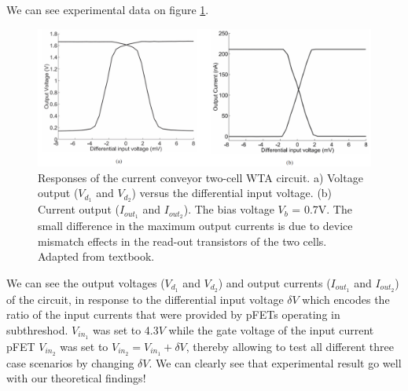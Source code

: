We can see experimental data on figure \ref{fig:WTA_Output}. 

\begin{figure}[H]
    \centering
    \includegraphics[width=0.9\linewidth]{../../Figures/WTA_Output.PNG}
    \caption{Responses of the current conveyor two-cell WTA circuit. a) Voltage output ($V_d_1$ and $V_d_2$) versus the differential input voltage. (b) Current output ($I_{out_1}$ and $I_{out_2}$). The bias voltage $V_b$ = 0.7V. The small difference in the maximum output currents is due to device mismatch effects in the read-out transistors of the two cells. Adapted from textbook.}
    \label{fig:WTA_Output}
\end{figure}

We can see the output voltages ($V_d_1$ and $V_d_2$) and output currents ($I_{out}_1$ and $I_{out}_2$) of the circuit, in response to the differential input voltage $\delta V$ which encodes the ratio of the input currents that were provided by pFETs operating in subthreshod. $V_{in}_1$ was set to 4.3$V$ while the gate voltage of the input current pFET $V_{in}_2$ was set to $V_{in}_2 = V_{in}_1 + \delta V$, thereby allowing to test all different three case scenarios by changing $\delta V$. We can clearly see that experimental result go well with our theoretical findings!

















